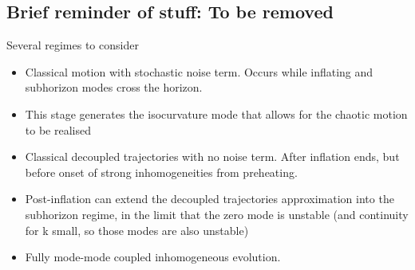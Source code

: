 \subsection{Brief reminder of stuff: To be removed}
Several regimes to consider
\begin{itemize}
\item Classical motion with stochastic noise term.  Occurs while inflating and subhorizon modes cross the horizon.
\item This stage generates the isocurvature mode that allows for the chaotic motion to be realised
\item Classical decoupled trajectories with no noise term.  After inflation ends, but before onset of strong inhomogeneities from preheating.
\item Post-inflation can extend the decoupled trajectories approximation into the subhorizon regime, in the limit that the zero mode is unstable (and continuity for k small, so those modes are also unstable)
\item Fully mode-mode coupled inhomogeneous evolution.
\end{itemize}
